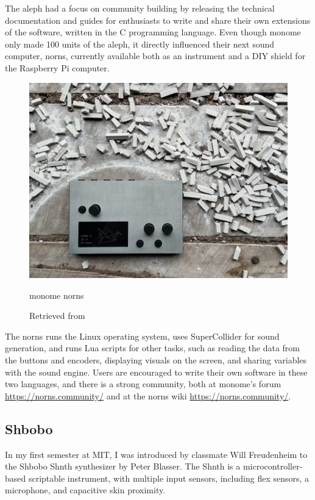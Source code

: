 The aleph had a focus on community building by releasing the technical documentation and guides for enthusiasts to write and share their own extensions of the software, written in the C programming language. Even though monome only made 100 units of the aleph, it directly influenced their next sound computer, norns, currently available both as an instrument and a \acrshort{DIY} shield for the Raspberry Pi computer.

\begin{figure}[ht]
  \centering
  \includegraphics[width=0.75\linewidth,height=0.25\textheight,keepaspectratio]{images/monome-norns.jpg}
  \caption{monome norns}
  \caption*{Retrieved from \cite{website-monome-current}}
  \label{fig:monome-norns}
\end{figure}

The norns runs the Linux operating system, uses SuperCollider for sound generation, and runs Lua scripts for other tasks, such as reading the data from the buttons and encoders, displaying visuals on the screen, and sharing variables with the sound engine. Users are encouraged to write their own software in these two languages, and there is a strong community, both at monome's forum \url{https://norns.community/} and at the norns wiki \url{https://norns.community/}.

\subsection{Shbobo}

In my first semester at MIT, I was introduced by classmate Will Freudenheim to the Shbobo Shnth synthesizer by Peter Blasser. The Shnth is a microcontroller-based scriptable instrument, with multiple input sensors, including flex sensors,  a microphone, and capacitive skin proximity.


